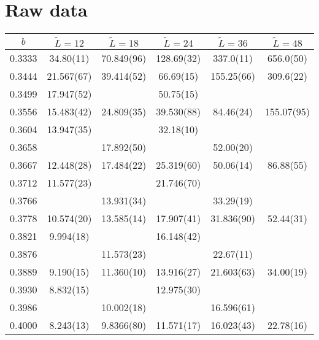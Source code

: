 
\chapter{Raw data}
\label{apex_data}


\begin{longtable}{ c | c | c | c | c | c }
\toprule
 $b$ & $\tilde{L}=12$ & $\tilde{L}=18$ & $\tilde{L}=24$ & $\tilde{L}=36$ & $\tilde{L}=48$\\
\midrule
0.3333	&	34.80(11)	&	70.849(96)	&	128.69(32)	&	337.0(11)	&	656.0(50)	\\
0.3444	&	21.567(67)	&	39.414(52)	&	66.69(15)	&	155.25(66)	&	309.6(22)	\\
0.3499	&	17.947(52)	&	 	&	50.75(15)	&	 	&	 	\\
0.3556	&	15.483(42)	&	24.809(35)	&	39.530(88)	&	84.46(24)	&	155.07(95)	\\
0.3604	&	13.947(35)	&	 	&	32.18(10)	&	 	&	 	\\
0.3658	&	 	&	17.892(50)	&	 	&	52.00(20)	&	 	\\
0.3667	&	12.448(28)	&	17.484(22)	&	25.319(60)	&	50.06(14)	&	86.88(55)	\\
0.3712	&	11.577(23)	&	 	&	21.746(70)	&	 	&	 	\\
0.3766	&	 	&	13.931(34)	&	 	&	33.29(19)	&	 	\\
0.3778	&	10.574(20)	&	13.585(14)	&	17.907(41)	&	31.836(90)	&	52.44(31)	\\
0.3821	&	9.994(18)	&	 	&	16.148(42)	&	 	&	 	\\
0.3876	&	 	&	11.573(23)	&	 	&	22.67(11)	&	 	\\
0.3889	&	9.190(15)	&	11.360(10)	&	13.916(27)	&	21.603(63)	&	34.00(19)	\\
0.3930	&	8.832(15)	&	 	&	12.975(30)	&	 	&	 	\\
0.3986	&	 	&	10.002(18)	&	 	&	16.596(61)	&	 	\\
0.4000	&	8.243(13)	&	9.8366(80)	&	11.571(17)	&	16.023(43)	&	22.78(16)	\\

\end{longtable}
